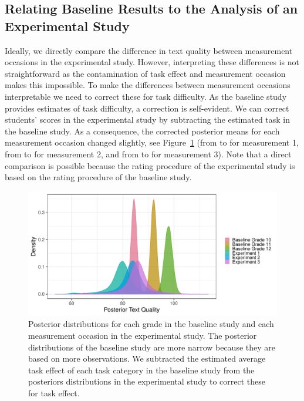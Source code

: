 \documentclass[a4paper]{article}
\newcommand{\getVal}[3]{%
	\pgfplotstablegetelem{#1}{#2}\of{#3}%
	\pgfmathprintnumber{\pgfplotsretval}%
}
\begin{document}
\subsection*{Relating Baseline Results to the Analysis of an Experimental Study}
\tbPostMeansProdCC

Ideally, we directly compare the difference in text quality between measurement occasions in the experimental study. However, interpreting these differences is not straightforward as the contamination of task effect and measurement occasion makes this impossible. To make the differences between measurement occasions interpretable we need to correct these for task difficulty. As the baseline study provides estimates of task difficulty, a correction is self-evident.  We can correct students' scores in the experimental study by subtracting the estimated task in the baseline study. As a consequence, the corrected posterior means for each measurement occasion changed slightly, see Figure~\ref{fig:comparePostTextQual} (from \getVal{0}{Mean}{\tbPostMeansProdCC} to \getVal{3}{Mean}{\tbPostMeansProdCC} for measurement 1, from \getVal{1}{Mean}{\tbPostMeansProdCC} to \getVal{4}{Mean}{\tbPostMeansProdCC} for measurement 2, and from \getVal{2}{Mean}{\tbPostMeansProdCC} to \getVal{5}{Mean}{\tbPostMeansProdCC} for measurement 3). Note that a direct comparison is possible because the rating procedure of the experimental study is based on the rating procedure of the baseline study.
\begin{figure}[!ht]
	\includegraphics[width=\textwidth]{comparePosteriorTextQuality.pdf}
	\caption{Posterior distributions for each grade in the baseline study and each measurement occasion in the experimental study. The posterior distributions of the baseline study are more narrow because they are based on more observations. We subtracted the estimated average task effect of each task category in the baseline study from the posteriors distributions in the experimental study to correct these for task effect.}
	\label{fig:comparePostTextQual}
\end{figure}
\end{document}
